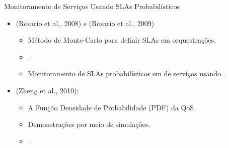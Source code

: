 \documentclass[xcolor=svgnames]{beamer}
\begin{document}
  \begin{frame}{ Monitoramento de Serviços Usando SLAs Probabilísticos}
      \begin{itemize}
	\item <1-> (Rosario et al., 2008) e (Rosario et al., 2009)
	    \begin{itemize}
	      \item Método de Monte-Carlo para definir SLAs em orquestrações.
	      \item \color{red}{Foco no tempo de resposta}.
	      \item Monitoramento de SLAs probabilísticos em \color{red}{orquestrações} de serviços usando \color{red}{Orc}.
	    \end{itemize}
	
	\item <2-> (Zheng et al., 2010):
	    \begin{itemize}
	      \item A Função Densidade de Probabilidade (PDF) da QoS. %
	      \item Demonstrações por meio de simulações.
	      \item \color{red}{Foco no tempo de resposta e não trata SLAs}.
	    \end{itemize}
      \end{itemize}

   \end{frame}
\end{document}
